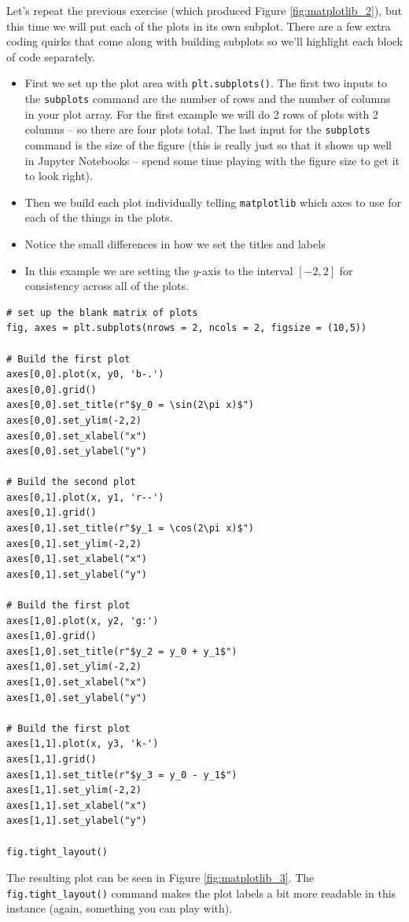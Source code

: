 \begin{example}
    Let's repeat the previous exercise (which produced Figure \ref{fig:matplotlib_2}), but
    this time we will put each of the plots in its own subplot.  There are a few extra
    coding quirks that come along with building subplots so we'll highlight each block of
    code separately.

    \begin{itemize}
        \item First we set up the plot area with \texttt{plt.subplots()}.  The first two inputs
            to the \texttt{subplots} command are the number of rows and the number of
            columns in your plot array.  For the first example we will do 2 rows of plots
            with 2 columns -- so there are four plots total. The last input for the
            \texttt{subplots} command is the size of the figure (this is really just so
            that it shows up well in Jupyter Notebooks -- spend some time playing with the
            figure size to get it to look right).
        \item Then we build each plot individually telling \texttt{matplotlib} which axes
            to use for each of the things in the plots.
        \item Notice the small differences in how we set the titles and labels
        \item In this example we are setting the $y$-axis to the interval $[-2,2]$ for
            consistency across all of the plots.
    \end{itemize}

\bcode
\begin{lstlisting}
# set up the blank matrix of plots
fig, axes = plt.subplots(nrows = 2, ncols = 2, figsize = (10,5))

# Build the first plot
axes[0,0].plot(x, y0, 'b-.')
axes[0,0].grid()
axes[0,0].set_title(r"$y_0 = \sin(2\pi x)$")
axes[0,0].set_ylim(-2,2)
axes[0,0].set_xlabel("x")
axes[0,0].set_ylabel("y")

# Build the second plot
axes[0,1].plot(x, y1, 'r--')
axes[0,1].grid()
axes[0,1].set_title(r"$y_1 = \cos(2\pi x)$")
axes[0,1].set_ylim(-2,2)
axes[0,1].set_xlabel("x")
axes[0,1].set_ylabel("y")

# Build the first plot
axes[1,0].plot(x, y2, 'g:')
axes[1,0].grid()
axes[1,0].set_title(r"$y_2 = y_0 + y_1$")
axes[1,0].set_ylim(-2,2)
axes[1,0].set_xlabel("x")
axes[1,0].set_ylabel("y")

# Build the first plot
axes[1,1].plot(x, y3, 'k-')
axes[1,1].grid()
axes[1,1].set_title(r"$y_3 = y_0 - y_1$")
axes[1,1].set_ylim(-2,2)
axes[1,1].set_xlabel("x")
axes[1,1].set_ylabel("y")

fig.tight_layout()
\end{lstlisting}
The resulting plot can be seen in Figure \ref{fig:matplotlib_3}. The
\texttt{fig.tight\_layout()} command makes the plot labels a bit more readable in this
instance (again, something you can play with).
\end{example}


